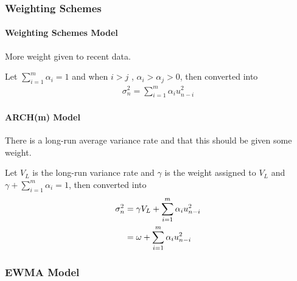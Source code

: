 \subsubsection{Weighting Schemes}
\paragraph{Weighting Schemes Model}
\begin{assumption}
    More weight given to recent data.
\end{assumption}
\noindent Let $\sum_{i=1}^{m} \alpha_{i}=1$ and when $i>j$ , $\alpha_{i}>\alpha_{j}>0$, then  converted into
\begin{align}
    \sigma_{n}^{2}=\sum_{i=1}^{m} \alpha_{i} u_{n-i}^{2}\label{eq1.4}
\end{align}
\paragraph{ARCH(m) Model}
\begin{assumption}
    There is a long-run average variance rate and that this should be given some weight.
\end{assumption}
\noindent Let $V_{L}$ is the long-run variance rate and $\gamma$ is the weight assigned to $V_{L}$ and $\gamma+\sum_{i=1}^{m} \alpha_{i}=1$, then  converted into 
\begin{align}
    \sigma_{n}^{2}&=\gamma V_{L}+\sum_{i=1}^{m} \alpha_{i} u_{n-i}^{2}\label{eq1.5}\\
    &=\omega+\sum_{i=1}^{m} \alpha_{i} u_{n-i}^{2}\notag
\end{align}

\subsubsection{EWMA Model}
